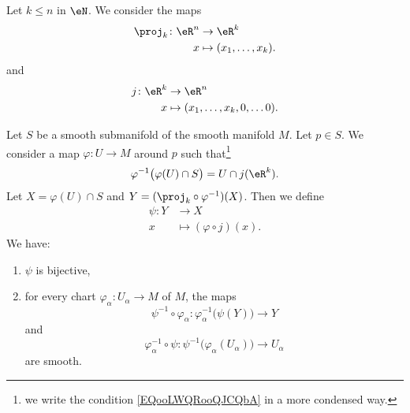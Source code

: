 Let \( k\leq n\) in \( \eN\). We consider the maps
\begin{equation}
	\begin{aligned}
		\proj_k\colon \eR^n & \to \eR^k                  \\
		x                   & \mapsto (x_1,\ldots, x_k).
	\end{aligned}
\end{equation}
and
\begin{equation}
	\begin{aligned}
		j\colon \eR^k & \to \eR^n                             \\
		x             & \mapsto (x_1,\ldots, x_k,0,\ldots 0).
	\end{aligned}
\end{equation}

\begin{proposition}
	Let \( S\) be a smooth submanifold of the smooth manifold \( M\). Let \( p\in S\). We consider a map \( \varphi\colon U\to M\) around \( p\) such that\footnote{we write the condition \ref{EQooLWQRooQJCQbA} in a more condensed way.}
	\begin{equation}
		\varphi^{-1}\big( \varphi(U)\cap S \big)=U\cap j(\eR^k).
	\end{equation}
	Let \( X=\varphi(U)\cap S\) and \( Y=(\proj_k\circ\varphi^{-1})(X)\). Then we define
	\begin{equation}
		\begin{aligned}
			\psi\colon Y & \to X                        \\
			x            & \mapsto (\varphi\circ j)(x).
		\end{aligned}
	\end{equation}
	We have:
	\begin{enumerate}
		\item
		      \( \psi\) is bijective,
		\item
		      for every chart \( \varphi_{\alpha}\colon U_{\alpha}\to M\) of \( M\), the maps
		      \begin{equation}        \label{EQooBAGFooDnpctJ}
			      \psi^{-1}\circ\varphi_{\alpha}\colon \varphi_{\alpha}^{-1}\big( \psi(Y) \big)\to Y
		      \end{equation}
		      and
		      \begin{equation}        \label{EQooKQIUooDCCczD}
			      \varphi_{\alpha}^{-1}\circ\psi\colon \psi^{-1}\big( \varphi_{\alpha}(U_{\alpha}) \big)\to U_{\alpha}
		      \end{equation}
		      are smooth.
	\end{enumerate}
\end{proposition}

